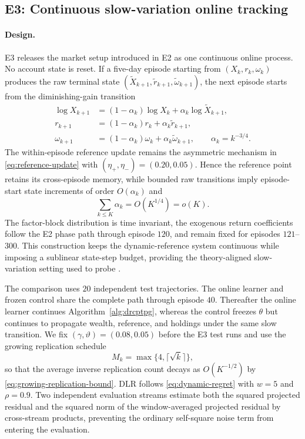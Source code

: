 \subsection{E3: Continuous slow-variation online tracking}\label{sec:e3}
\paragraph{Design.}
E3 releases the market setup introduced in E2 as one continuous online process.  No account state is reset.  If a five-day episode starting from $(X_k,r_k,\omega_k)$ produces the raw terminal state $(\widetilde X_{k+1},\widetilde r_{k+1},\widetilde\omega_{k+1})$, the next episode starts from the diminishing-gain transition
\[
\begin{aligned}
\log X_{k+1}
&=(1-\alpha_k)\log X_k+\alpha_k\log\widetilde X_{k+1},\\
r_{k+1}
&=(1-\alpha_k)r_k+\alpha_k\widetilde r_{k+1},\\
\omega_{k+1}
&=(1-\alpha_k)\omega_k+\alpha_k\widetilde\omega_{k+1},
\qquad
\alpha_k=k^{-3/4}.
\end{aligned}
\]
The within-episode reference update remains the asymmetric mechanism in \eqref{eq:reference-update} with $(\eta_+,\eta_-)=(0.20,0.05)$.  Hence the reference point retains its cross-episode memory, while bounded raw transitions imply episode-start state increments of order $O(\alpha_k)$ and
\[
\sum_{k\le K}\alpha_k=O(K^{1/4})=o(K).
\]
The factor-block distribution is time invariant, the exogenous return coefficients follow the E2 phase path through episode $120$, and remain fixed for episodes $121$--$300$.  This construction keeps the dynamic-reference system continuous while imposing a sublinear state-step budget, providing the theory-aligned slow-variation setting used to probe .

The comparison uses $20$ independent test trajectories.  The online learner and frozen control share the complete path through episode $40$.  Thereafter the online learner continues Algorithm~\ref{alg:drcptpg}, whereas the control freezes $\theta$ but continues to propagate wealth, reference, and holdings under the same slow transition.  We fix $(\gamma,\vartheta)=(0.08,0.05)$ before the E3 test runs and use the growing replication schedule
\[
M_k=\max\{4,\lceil\sqrt{k}\rceil\},
\]
so that the average inverse replication count decays as $O(K^{-1/2})$ by \eqref{eq:growing-replication-bound}.  DLR follows \eqref{eq:dynamic-regret} with $w=5$ and $\rho=0.9$.  Two independent evaluation streams estimate both the squared projected residual and the squared norm of the window-averaged projected residual by cross-stream products, preventing the ordinary self-square noise term from entering the evaluation.

